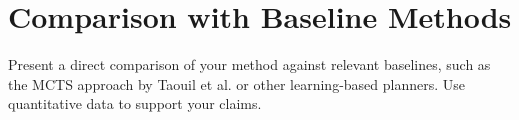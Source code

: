 \section{Comparison with Baseline Methods}

\begin{outline}
  Present a direct comparison of your method against relevant
  baselines, such as the MCTS approach by Taouil et al. or other
  learning-based planners. Use quantitative data to support your claims.
\end{outline}
